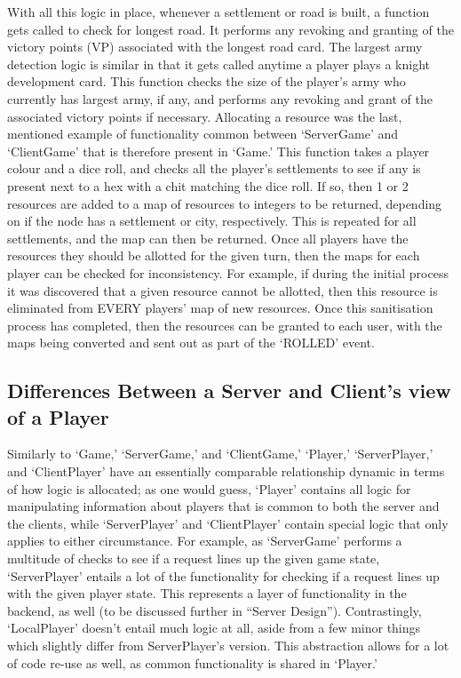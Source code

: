 \documentclass[a4paper,doc,draftfirst]{apa6}
\begin{document}
With all this logic in place, whenever a settlement or road is built, a function gets called to check for longest road. It performs any revoking and granting of the victory points (VP) associated with the longest road card. The largest army detection logic is similar in that it gets called anytime a player plays a knight development card. This function checks the size of the player’s army who currently has largest army, if any, and performs any revoking and grant of the associated victory points if necessary. Allocating a resource was the last, mentioned example of functionality common between ‘ServerGame’ and ‘ClientGame’ that is therefore present in ‘Game.’ This function takes a player colour and a dice roll, and checks all the player’s settlements to see if any is present next to a hex with a chit matching the dice roll. If so, then 1 or 2 resources are added to a map of resources to integers to be returned, depending on if the node has a settlement or city, respectively. This is repeated for all settlements, and the map can then be returned. Once all players have the resources they should be allotted for the given turn, then the maps for each player can be checked for inconsistency. For example, if during the initial process it was discovered that a given resource cannot be allotted, then this resource is eliminated from EVERY players’ map of new resources. Once this sanitisation process has completed, then the resources can be granted to each user, with the maps being converted and sent out as part of the ‘ROLLED’ event.

\subsection{Differences Between a Server and Client's view of a Player}
Similarly to ‘Game,’ ‘ServerGame,’ and ‘ClientGame,’ ‘Player,’ ‘ServerPlayer,’ and ‘ClientPlayer’ have an essentially comparable relationship dynamic in terms of how logic is allocated; as one would guess, ‘Player’ contains all logic for manipulating information about players that is common to both the server and the clients, while ‘ServerPlayer’ and ‘ClientPlayer’ contain special logic that only applies to either circumstance. For example, as ‘ServerGame’ performs a multitude of checks to see if a request lines up the given game state, ‘ServerPlayer’ entails a lot of the functionality for checking if a request lines up with the given player state. This represents a layer of functionality in the backend, as well (to be discussed further in “Server Design”). Contrastingly, ‘LocalPlayer’ doesn’t entail much logic at all, aside from a few minor things which slightly differ from ServerPlayer’s version. This abstraction allows for a lot of code re-use as well, as common functionality is shared in ‘Player.’
\end{document}
